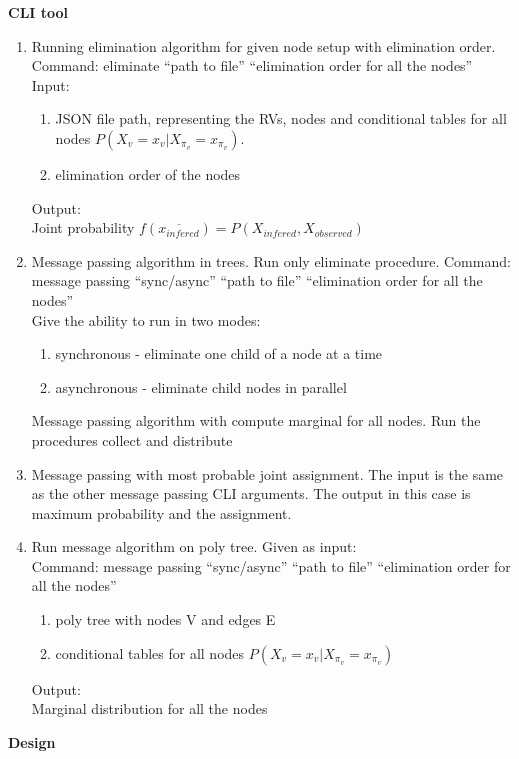 \documentclass{article}
\begin{document}
    \vspace{0.1cm}
    \textbf{CLI tool}\\
    \begin{enumerate}
        \item Running elimination algorithm for given node setup with elimination order.\\
        Command: eliminate \enquote{path to file} \enquote{elimination order for all the nodes}\\
        Input:\\
        \begin{enumerate}
            \item JSON file path, representing the RVs, nodes and conditional tables for all nodes $P(X_v=x_v|X_{\pi_v}=x_{\pi_v})$.
            \item elimination order of the nodes
        \end{enumerate}
        Output:\\
        Joint probability $f(\overline{x_{infered}})=P(X_{infered},X_{observed})$\\

        

        \item Message passing algorithm in trees. Run only eliminate procedure.
        Command: message passing \enquote{sync/async} \enquote{path to file} \enquote{elimination order for all the nodes}\\
        Give the ability to run in two modes:\\
        \begin{enumerate}
            \item synchronous - eliminate one child of a node at a time
            \item asynchronous - eliminate child nodes in parallel
        \end{enumerate}
        Message passing algorithm with compute marginal for all nodes. Run the procedures collect and distribute\\

        \item Message passing with most probable joint assignment. The input is the same as the other message passing CLI arguments. The output in this case is maximum probability and the assignment.

        \item Run message algorithm on poly tree. Given as input:\\
        Command: message passing \enquote{sync/async} \enquote{path to file} \enquote{elimination order for all the nodes}\\
        \begin{enumerate}
            \item poly tree with nodes V and edges E
            \item conditional tables for all nodes $P(X_v=x_v|X_{\pi_v}=x_{\pi_v})$
        \end{enumerate}
        Output:\\
        Marginal distribution for all the nodes
    \end{enumerate}

    \vspace{0.5cm}
    \textbf{Design}\\
\end{document}
